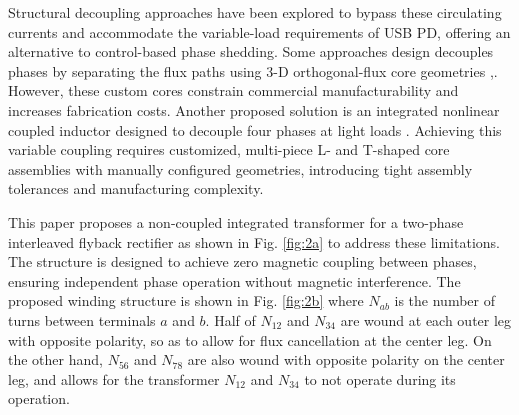 \documentclass[lettersize,journal]{IEEEtran}
\begin{document}
Structural decoupling approaches have been explored to bypass these circulating currents and accommodate the variable-load requirements of USB PD, offering an alternative to control-based phase shedding. Some approaches design decouples phases by separating the flux paths using  3-D orthogonal-flux core geometries \cite{Ouyang},\cite{fayyaz2025}. However, these custom cores constrain commercial manufacturability and increases fabrication costs. Another proposed solution is an integrated nonlinear coupled inductor designed to decouple four phases at light loads \cite{Z_Li_2025}. Achieving this variable coupling requires customized, multi-piece L- and T-shaped core assemblies with manually configured geometries, introducing tight assembly tolerances and manufacturing complexity.


This paper proposes a non-coupled integrated transformer for a two-phase interleaved flyback rectifier as shown in Fig. \ref{fig:2a} to address these limitations. The structure is designed to achieve zero magnetic coupling between phases, ensuring independent phase operation without magnetic interference. The proposed winding structure is shown in Fig. \ref{fig:2b} where $N_{ab}$ is the number of turns between terminals $a$ and $b$. Half of $N_{12}$ and $N_{34}$ are wound at each outer leg with opposite polarity, so as to allow for flux cancellation at the center leg. On the other hand, $N_{56}$ and $N_{78}$ are also wound with opposite polarity on the center leg, and allows for the transformer $N_{12}$ and $N_{34}$ to not operate during its operation. 
\end{document}
